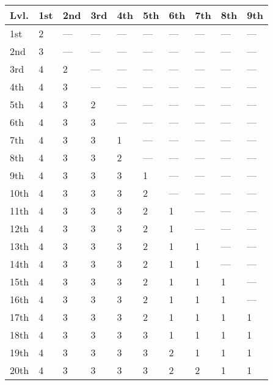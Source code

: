 \documentclass[
]{article}
\begin{document}
\begin{longtable}[]{@{}llllllllll@{}}
\toprule
Lvl. & 1st & 2nd & 3rd & 4th & 5th & 6th & 7th & 8th &
9th\tabularnewline
\midrule
\endhead
1st & 2 & --- & --- & --- & --- & --- & --- & --- & ---\tabularnewline
2nd & 3 & --- & --- & --- & --- & --- & --- & --- & ---\tabularnewline
3rd & 4 & 2 & --- & --- & --- & --- & --- & --- & ---\tabularnewline
4th & 4 & 3 & --- & --- & --- & --- & --- & --- & ---\tabularnewline
5th & 4 & 3 & 2 & --- & --- & --- & --- & --- & ---\tabularnewline
6th & 4 & 3 & 3 & --- & --- & --- & --- & --- & ---\tabularnewline
7th & 4 & 3 & 3 & 1 & --- & --- & --- & --- & ---\tabularnewline
8th & 4 & 3 & 3 & 2 & --- & --- & --- & --- & ---\tabularnewline
9th & 4 & 3 & 3 & 3 & 1 & --- & --- & --- & ---\tabularnewline
10th & 4 & 3 & 3 & 3 & 2 & --- & --- & --- & ---\tabularnewline
11th & 4 & 3 & 3 & 3 & 2 & 1 & --- & --- & ---\tabularnewline
12th & 4 & 3 & 3 & 3 & 2 & 1 & --- & --- & ---\tabularnewline
13th & 4 & 3 & 3 & 3 & 2 & 1 & 1 & --- & ---\tabularnewline
14th & 4 & 3 & 3 & 3 & 2 & 1 & 1 & --- & ---\tabularnewline
15th & 4 & 3 & 3 & 3 & 2 & 1 & 1 & 1 & ---\tabularnewline
16th & 4 & 3 & 3 & 3 & 2 & 1 & 1 & 1 & ---\tabularnewline
17th & 4 & 3 & 3 & 3 & 2 & 1 & 1 & 1 & 1\tabularnewline
18th & 4 & 3 & 3 & 3 & 3 & 1 & 1 & 1 & 1\tabularnewline
19th & 4 & 3 & 3 & 3 & 3 & 2 & 1 & 1 & 1\tabularnewline
20th & 4 & 3 & 3 & 3 & 3 & 2 & 2 & 1 & 1\tabularnewline
\bottomrule
\end{longtable}
\end{document}

